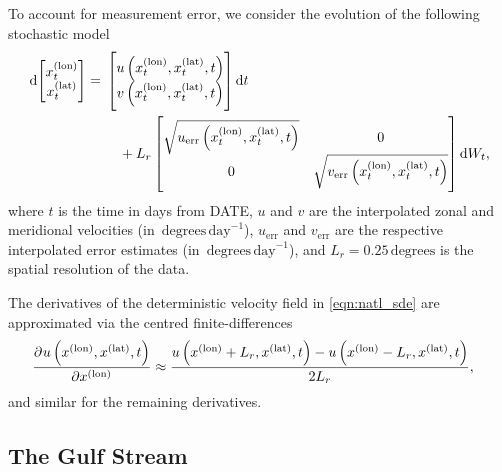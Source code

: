To account for measurement error, we consider the evolution of the following stochastic model
\begin{equation}
	\dif \begin{bmatrix}
			x^{(\mathrm{lon})}_t \\ x^{(\mathrm{lat})}_t
		\end{bmatrix} = \begin{multlined}[t]
			\begin{bmatrix} u\left(x^{(\mathrm{lon})}_t, x^{(\mathrm{lat})}_t, t\right) \\ v\left(x^{(\mathrm{lon})}_t, x^{(\mathrm{lat})}_t, t\right) \end{bmatrix}\dif t \\
				+ L_r\begin{bmatrix}
			\sqrt{u_{\mathrm{err}}\left(x^{(\mathrm{lon})}_t, x^{(\mathrm{lat})}_t, t\right)} & 0                                                                                 \\
			0                                                                                 & \sqrt{v_{\mathrm{err}}\left(x^{(\mathrm{lon})}_t, x^{(\mathrm{lat})}_t, t\right)}
		\end{bmatrix} \dif W_t,
\end{multlined}
	\label{eqn:natl_sde}
\end{equation}
where \(t\) is the time in days from DATE, \(u\) and \(v\) are the interpolated zonal and meridional velocities (in \(\mathrm{\,degrees\,day}^{-1}\)), \(u_{\mathrm{err}}\) and \(v_{\mathrm{err}}\) are the respective interpolated error estimates (in \(\mathrm{\,degrees\,day}^{-1}\)), and \(L_r = 0.25 \mathrm{\,degrees}\) is the spatial resolution of the data.



The derivatives of the deterministic velocity field in \eqref{eqn:natl_sde} are approximated via the centred finite-differences
\begin{align*}
	\dpd{u\left({x^{(\text{lon})}}, {x^{(\text{lat})}}, t\right)}{{x^{(\text{lon})}}} & \approx \frac{u\left(x^{(\text{lon})} + L_r, x^{(\text{lat})}, t\right) - u\left(x^{(\text{lon})} - L_r, x^{(\text{lat})}, t\right)}{2 L_r},
\end{align*}
and similar for the remaining derivatives.


\subsection{The Gulf Stream}\label{sec:gulf_stream}


